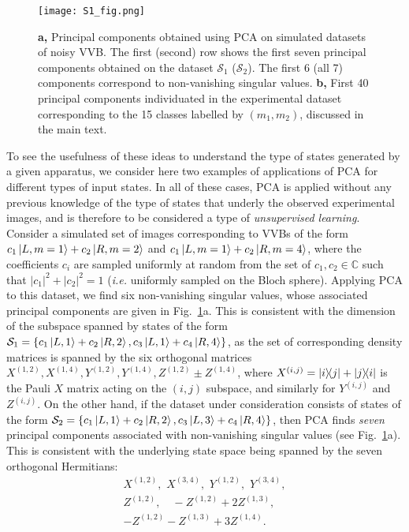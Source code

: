 \begin{figure}[tb]
  \centering
  \texttt{[image: S1\_fig.png]}
  \caption{
      \textbf{a,}
       Principal components obtained using PCA on simulated datasets of noisy VVB. The first (second) row shows the first seven principal components obtained on the dataset $\mathcal S_1$ ($\mathcal S_2$). 
       The first 6 (all 7) components correspond to non-vanishing singular values.
       \textbf{b,} First 40 principal components individuated in the experimental dataset corresponding to the 15 classes labelled by $(m_1,m_2)$, discussed in the main text.%
    }
    \label{fig:S1}
\end{figure}


To see the usefulness of these ideas to understand the type of states generated by a given apparatus, we consider here two examples of applications of \ac{PCA} for different types of input states. 
In all of these cases, \ac{PCA} is applied without any previous knowledge of the type of states that underly the observed experimental images, and is therefore to be considered a type of \emph{unsupervised learning}.
Consider a simulated set of images corresponding to VVBs of the form
$c_1\ket{L,m=1}+c_2\ket{R,m=2}$ and
$c_1\ket{L,m=1}+c_2\ket{R,m=4}$, where the coefficients $c_i$ are sampled uniformly at random from the set of $c_{1},c_2\in\mathbb{C}$  such that $|c_1|^2+|c_2|^2=1$ (\emph{i.e.} uniformly sampled on the Bloch sphere).
Applying PCA to this dataset, we find six non-vanishing singular values, whose associated principal components are given in Fig.~\ref{fig:S1}a.
This is consistent with the dimension of the subspace  spanned by states of the form $\mathcal S_1=\{c_1\ket{L,1}+c_2\ket{R,2}, c_3\ket{L,1}+c_4\ket{R,4}\}$,  as the set of corresponding density matrices is spanned by the six orthogonal matrices
$X^{(1,2)}, X^{(1,4)}, Y^{(1,2)},Y^{(1,4)},Z^{(1,2)}\pm Z^{(1,4)}$, where $X^{(i,j)}=\ketbra{i}{j}+\ketbra{j}{i}$ is the Pauli $X$ matrix acting on the $(i,j)$ subspace, and similarly for $Y^{(i,j)}$ and $Z^{(i,j)}$.
On the other hand, if the dataset under consideration consists of states of the form $\mathcal S_2=\{c_1\ket{L,1}+c_2\ket{R,2}, c_3\ket{L,3}+c_4\ket{R,4}\}$, then \ac{PCA} finds \emph{seven} principal components associated with non-vanishing singular values (see Fig.~\ref{fig:S1}a).
This is consistent with the underlying state space being spanned by the seven orthogonal Hermitians:
\begin{equation}
\begin{gathered}
    X^{(1,2)}, \,\, X^{(3,4)}, \,\,
    Y^{(1,2)}, \,\, Y^{(3,4)}, \\
    Z^{(1,2)},\quad
    -Z^{(1,2)} + 2 Z^{(1,3)}, \\
    -Z^{(1,2)} - Z^{(1,3)} + 3 Z^{(1,4)}.
\end{gathered}
\end{equation}
